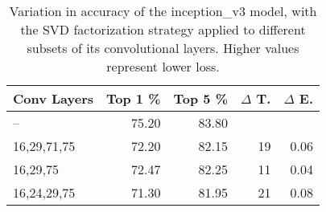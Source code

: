 \begin{table}
\centering
\begin{tabular}{|l|r|r|r|r|}
\hline
Conv Layers & Top 1 \% & Top 5 \% & $\Delta$ T. & $\Delta$ E. \\\hline
-- & 75.20 & 83.80  &  & \\\hline
16,29,71,75 & 72.20 & 82.15 & 19 & 0.06 \\\hline
16,29,75 & 72.47 & 82.25 & 11 & 0.04 \\\hline
16,24,29,75 & 71.30 & 81.95 & 21 & 0.08 \\\hline
\end{tabular}
\caption{Variation in accuracy of the inception\_v3 model, with the SVD factorization strategy applied to different subsets of its convolutional layers. Higher values represent lower loss.}
\label{inception_v3-accuracy}
\end{table}
